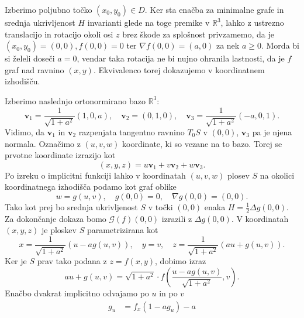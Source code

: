\documentclass[fin1, tisk, bibtex]{fmfdelo}
\begin{document}
\begin{dokaz}
    Izberimo poljubno točko $\left(x_0, y_0\right) \in D$. Ker sta enačba za minimalne grafe in srednja ukrivljenost $H$ invarianti glede na toge premike v $\mathbb{R}^3$, lahko z ustrezno translacijo in rotacijo okoli osi $z$ brez škode za splošnost privzamemo, da je $\left(x_0, y_0\right)=(0,0), f(0,0)=0$ ter $\nabla f(0,0)=(a, 0)$ za nek $a \geq 0$. Morda bi si želeli doseči $a=0$, vendar taka rotacija ne bi nujno ohranila lastnosti, da je $f$ graf nad ravnino $(x,y)$. Ekvivalenco torej dokazujemo v koordinatnem izhodišču. 
    
    Izberimo naslednjo ortonormirano bazo $\mathbb{R}^3$:
    \begin{equation*}
        \mathbf{v}_1=\frac{1}{\sqrt{1+a^2}}(1,0, a), \quad \mathbf{v}_2=(0,1,0), \quad \mathbf{v}_3=\frac{1}{\sqrt{1+a^2}}(-a, 0,1).
    \end{equation*}
    Vidimo, da $\mathbf{v}_1$ in $\mathbf{v}_2$ razpenjata tangentno ravnino $T_0 S$ v $(0,0)$, $\mathbf{v}_3$ pa je njena normala. Označimo z $(u, v, w)$ koordinate, ki so vezane na to bazo. Torej se prvotne koordinate izrazijo kot 
    \begin{equation*}
        (x, y, z)=u \mathbf{v}_1+v \mathbf{v}_2+w \mathbf{v}_3.
    \end{equation*}
    Po izreku o implicitni funkciji lahko v koordinatah $(u,v,w)$ plosev $S$ na okolici koordinatnega izhodišča podamo kot graf oblike
    \begin{equation*}
        w=g(u, v), \quad g(0,0)=0, \quad \nabla g(0,0)=(0,0).
    \end{equation*}
    Tako kot prej bo srednja ukrivljenost $S$ v točki $(0,0)$ enaka $H=\frac{1}{2}\Delta g(0,0)$. Za dokončanje dokaza bomo $\mathcal{G}(f)(0,0)$ izrazili z $\Delta g(0,0)$. V koordinatah $(x, y, z)$ je ploskev $S$ parametrizirana kot 
    \begin{equation*}
        x=\frac{1}{\sqrt{1+a^2}}(u-a g(u, v)), \quad y=v, \quad z=\frac{1}{\sqrt{1+a^2}}(a u+g(u, v)) .
    \end{equation*}
    Ker je $S$ prav tako podana z $z=f(x, y)$, dobimo izraz
    \begin{equation*}
        a u+g(u, v)=\sqrt{1+a^2} \cdot f\left(\frac{u-a g(u, v)}{\sqrt{1+a^2}}, v\right) .
    \end{equation*}
    Enačbo dvakrat implicitno odvajamo po $u$ in po $v$
    \begin{align*}
        g_u & =f_x\left(1-a g_u\right) - a\\

\end{align*}
\end{dokaz}
\end{document}
